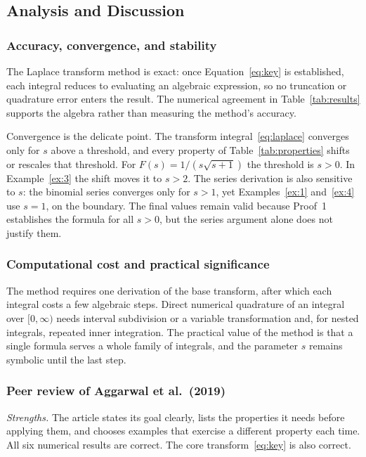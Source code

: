 \documentclass[12pt,a4paper]{article}
\theoremstyle{definition}
\theoremstyle{plain}
\theoremstyle{remark}
\begin{document}
	\subsection{Analysis and Discussion}
	
	\subsubsection{Accuracy, convergence, and stability}
	
	The Laplace transform method is exact: once Equation~\eqref{eq:key} is established, each integral reduces to evaluating an algebraic expression, so no truncation or quadrature error enters the result. The numerical agreement in Table~\ref{tab:results} supports the algebra rather than measuring the method's accuracy.
	
	Convergence is the delicate point. The transform integral~\eqref{eq:laplace} converges only for $s$ above a threshold, and every property of Table~\ref{tab:properties} shifts or rescales that threshold. For $F(s)=1/(s\sqrt{s+1})$ the threshold is $s>0$. In Example~\ref{ex:3} the shift moves it to $s>2$. The series derivation is also sensitive to $s$: the binomial series converges only for $s>1$, yet Examples~\ref{ex:1} and~\ref{ex:4} use $s=1$, on the boundary. The final values remain valid because Proof~1 establishes the formula for all $s>0$, but the series argument alone does not justify them.
	
	\subsubsection{Computational cost and practical significance}
	
	The method requires one derivation of the base transform, after which each integral costs a few algebraic steps. Direct numerical quadrature of an integral over $[0,\infty)$ needs interval subdivision or a variable transformation and, for nested integrals, repeated inner integration. The practical value of the method is that a single formula serves a whole family of integrals, and the parameter $s$ remains symbolic until the last step.
	
	\subsubsection{Peer review of Aggarwal et al.\ (2019)}
	
	\textit{Strengths.} The article states its goal clearly, lists the properties it needs before applying them, and chooses examples that exercise a different property each time. All six numerical results are correct. The core transform~\eqref{eq:key} is also correct.
	
\end{document}
